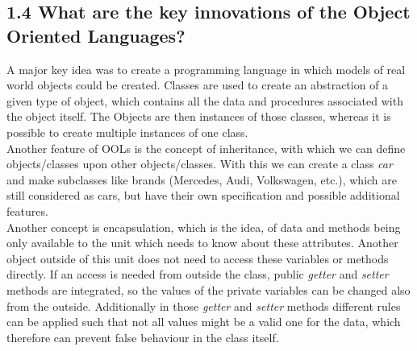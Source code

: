 \documentclass{article}
\begin{document}
	\subsection*{1.4 What are the key innovations of the Object Oriented Languages?}
	\begin{adjustwidth}{2em}{2em}
		A major key idea was to create a programming language in which models of real world objects could be created. Classes are used to create an abstraction of a given type of object, which contains all the data and procedures associated with the object itself. The Objects are then instances of those classes, whereas it is possible to create multiple instances of one class. \\
		Another feature of OOLs is the concept of inheritance, with which we can define objects/classes upon other objects/classes. With this we can create a class \textit{car} and make subclasses like brands (Mercedes, Audi, Volkswagen, etc.), which are still considered as cars, but have their own specification and possible additional features. \\
		Another concept is encapsulation, which is the idea, of data and methods being only available to the unit which needs to know about these attributes. Another object outside of this unit does not need to access these variables or methods directly. If an access is needed from outside the class, public \textit{getter} and \textit{setter} methods are integrated, so the values of the private variables can be changed also from the outside. Additionally in those \textit{getter} and \textit{setter} methods different rules can be applied such that not all values might be a valid one for the data, which therefore can prevent false behaviour in the class itself.
	\end{adjustwidth}
\end{document}
